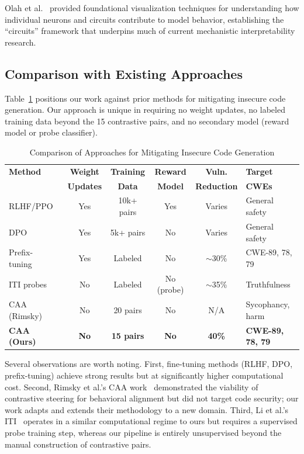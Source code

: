 \documentclass[journal, onecolumn]{IEEEtran}
\begin{document}
Olah et al.~\cite{olah2020} provided foundational visualization techniques for understanding how individual neurons and circuits contribute to model behavior, establishing the ``circuits'' framework that underpins much of current mechanistic interpretability research.

\subsection{Comparison with Existing Approaches}

Table~\ref{tab:sota} positions our work against prior methods for mitigating insecure code generation. Our approach is unique in requiring no weight updates, no labeled training data beyond the 15 contrastive pairs, and no secondary model (reward model or probe classifier).

\begin{table}[h]
\centering
\caption{Comparison of Approaches for Mitigating Insecure Code Generation}
\label{tab:sota}
\footnotesize
\begin{tabular}{@{}p{2.8cm}ccccp{2.2cm}@{}}
\toprule
\textbf{Method} & \textbf{Weight} & \textbf{Training} & \textbf{Reward} & \textbf{Vuln.} & \textbf{Target} \\
 & \textbf{Updates} & \textbf{Data} & \textbf{Model} & \textbf{Reduction} & \textbf{CWEs} \\ \midrule
RLHF/PPO~\cite{ouyang2022} & Yes & 10k+ pairs & Yes & Varies & General safety \\
DPO~\cite{rafailov2023} & Yes & 5k+ pairs & No & Varies & General safety \\
Prefix-tuning~\cite{he2023} & Yes & Labeled & No & $\sim$30\% & CWE-89, 78, 79 \\
ITI probes~\cite{li2024} & No & Labeled & No (probe) & $\sim$35\% & Truthfulness \\
CAA (Rimsky)~\cite{rimsky2024} & No & 20 pairs & No & N/A & Sycophancy, harm \\
\textbf{CAA (Ours)} & \textbf{No} & \textbf{15 pairs} & \textbf{No} & \textbf{40\%} & \textbf{CWE-89, 78, 79} \\ \bottomrule
\end{tabular}
\end{table}

Several observations are worth noting. First, fine-tuning methods (RLHF, DPO, prefix-tuning) achieve strong results but at significantly higher computational cost. Second, Rimsky et al.'s CAA work~\cite{rimsky2024} demonstrated the viability of contrastive steering for behavioral alignment but did not target code security; our work adapts and extends their methodology to a new domain. Third, Li et al.'s ITI~\cite{li2024} operates in a similar computational regime to ours but requires a supervised probe training step, whereas our pipeline is entirely unsupervised beyond the manual construction of contrastive pairs.
\end{document}
